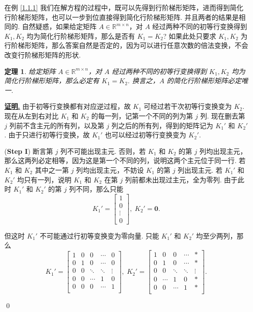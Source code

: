 \documentclass[10pt,openany]{article}
\theoremstyle{thmstyle} %
\newtheorem{theorem}{定理}[subsection]
\theoremstyle{defstyle} %
\theoremstyle{prostyle} %
\theoremstyle{exastyle}
\theoremstyle{remstyle}
\renewenvironment{proof}[1][证明]{\par\underline{\textbf{#1.}} \;\fangsong}{\qed\par}
\begin{document}
在例 \ref{1.1.1} 我们在解方程的过程中，既可以先得到行阶梯形矩阵，进而得到简化行阶梯形矩阵，也可以一步到位直接得到简化行阶梯形矩阵. 并且两者的结果是相同的. 自然疑惑，如果给定矩阵 \( A \in \mathbb{R}^{m \times n} \)，对 \( A \) 经过两种不同的初等行变换得到 \( K_1, K_2 \) 均为简化行阶梯形矩阵，那么是否有 \( K_1 = K_2 \)? 如果此处只要求 \( K_1, K_2 \) 为行阶梯形矩阵，那么答案自然是否定的，因为可以进行任意次数的倍法变换，不会改变行阶梯形矩阵的形状. 

\begin{theorem}
	给定矩阵 \( A \in \mathbb{R}^{m \times n} \)，对 \( A \) 经过两种不同的初等行变换得到 \( K_1, K_2 \) 均为简化行阶梯形矩阵，那么必定有 \( K_1=K_2 \). 换言之，\( A \) 的简化行阶梯形矩阵必定唯一. 
	\label{1.1.9}
\end{theorem}

\begin{proof}
	由于初等行变换都有对应逆过程，故 \( K_1 \) 可经过若干次初等行变换变为 \( K_2 \). 现在从左到右对比 \( K_1 \) 和 \( K_2 \) 的每一列，记第一个不同的列为第 \( j \) 列. 现在删去第 \( j \) 列前不含主元的所有列，以及第 \( j \) 列之后的所有列，得到的矩阵记为 \( K_1' \) 和 \( K_2' \). 由于只进行初等行变换，故 \( K_1' \) 也可以经过初等行变换变为 \( K_2' \).
	
	(\textbf{Step I}) 断言第 \( j \) 列不可能出现主元. 否则，若 \( K_1 \) 和 \( K_2 \) 的第 \( j \) 列均出现主元，那么这两列必定相等，因为这是第一个不同的列，说明这两个主元位于同一行. 若 \( K_1 \) 和 \( K_2 \) 其中之一第 \( j \) 列均出现主元，不妨设 \( K_1 \) 的第 \( j \) 列出现主元. 若 \( K_1' \) 和 \( K_2' \) 均只有一列，说明 \( K_1 \) 和 \( K_2 \) 在第 \( j \) 列前都未出现过主元，全为零列. 由于此时 \( K_1' \) 和 \( K_2' \) 的第 \( j \) 列不同，那么只能
	\[ K_1'= \begin{bmatrix}
		1 \\ 0 \\ \vdots \\ 0
	\end{bmatrix}, \; K_2'= \bm{0}. \]
	
	但这时 \( K_1' \) 不可能通过行初等变换变为零向量. 只能 \( K_1' \) 和 \( K_2' \) 均至少两列，那么
	\[ K_1'= \begin{bmatrix}
		1 & 0 & 0  & \cdots & 0 \\
		0 & 1 & 0 & \cdots & 0 \\
		0 & 0 & \ddots & \ddots & \vdots \\
		0 & 0 & \cdots & 1 & 0 \\
		0 & 0 & 0 & \cdots & 1 \\
		 &  &  &  & 
	\end{bmatrix}, \; K_2'=\begin{bmatrix}
	1 & 0 & 0  & \cdots & * \\
	0 & 1 & 0   & \cdots & * \\
	0 & 0 & \ddots & \ddots & \vdots \\
	0 &  \cdots & 1  & 0 & * \\
	0 & 0  & \cdots & 1 & * \\
	 &  &  &  &   
	\end{bmatrix}.  \]
	

\end{proof}
\end{document}
